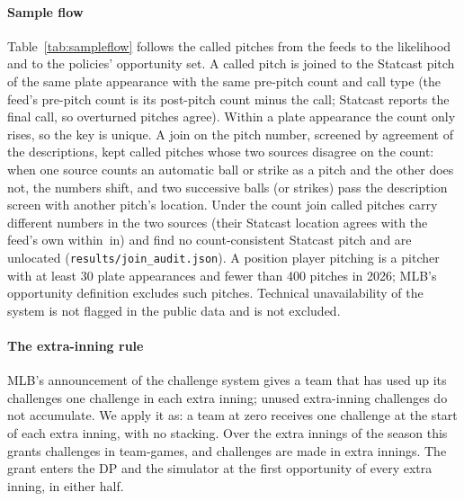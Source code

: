 \documentclass[aoas]{imsart}
\theoremstyle{plain}
\theoremstyle{definition}
\begin{document}
\paragraph{Sample flow} Table~\ref{tab:sampleflow} follows the called pitches from the feeds to the likelihood and to
the policies' opportunity set. A called pitch is joined to the Statcast pitch of the same plate appearance with the
same pre-pitch count and call type (the feed's pre-pitch count is its post-pitch count minus the call; Statcast
reports the final call, so overturned pitches agree). Within a plate appearance the count only rises, so the key is
unique. A join on the pitch number, screened by agreement of the descriptions, kept \NCountIncons{} called
pitches whose two sources disagree on the count: when one source counts an automatic ball or strike as a pitch and the
other does not, the numbers shift, and two successive balls (or strikes) pass the description screen with another
pitch's location. Under the count join \NRenumbered{} called pitches carry different numbers in the two sources (their
Statcast location agrees with the feed's own within \RenumMaxDiff\,in) and \NUnmatched{} find no count-consistent
Statcast pitch and are unlocated (\texttt{results/join\_audit.json}). A position
player pitching is a pitcher with at least 30 plate appearances and fewer than 400 pitches in 2026; MLB's
opportunity definition excludes such pitches. Technical unavailability of the system is not flagged in the public
data and is not excluded.

\begin{table}[!htbp]
\caption{Sample flow, 2026 regular season (\NGamesABS{} ABS games).}\label{tab:sampleflow}
\centering\small

\end{table}

\paragraph{The extra-inning rule} MLB's announcement of the challenge system \citep{MLB2025abs} gives a team that has
used up its challenges one challenge in each extra inning; unused extra-inning challenges do not accumulate. We apply
it as: a team at zero receives one challenge at the start of each extra inning, with no stacking. Over the
\SFcExtraInnings{} extra innings of the season this grants \SFcGrants{} challenges in \SFcGrantTeamGames{} team-games,
and \SFcExtraCh{} challenges are made in extra innings. The grant enters the DP and the simulator at the first opportunity
of every extra inning, in either half.
\end{document}
